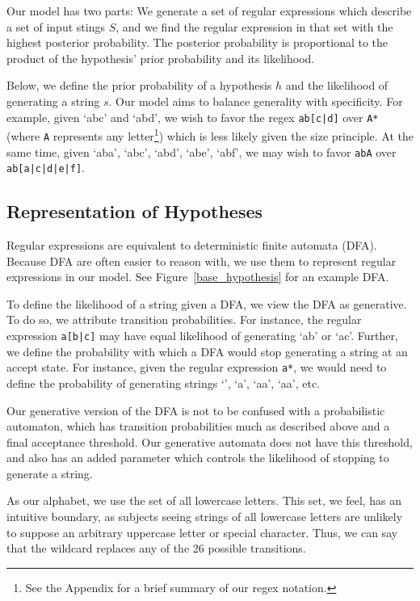 \documentclass[10pt,letterpaper]{article}
\begin{document}
Our model has two parts: We generate a set of regular expressions which describe a set of input stings $S$, and we find the regular expression in that set with the highest posterior probability. The posterior probability is proportional to the product of the hypothesis' prior probability and its likelihood.

Below, we define the prior probability of a hypothesis $h$ and the likelihood of generating a string $s$. Our model aims to balance generality with specificity. For example, given `abc' and `abd', we wish to favor the regex \verb!ab[c|d]! over \verb!A*! (where \verb!A! represents any letter\footnote{See the Appendix for a brief summary of our regex notation.}) which is less likely given the size principle. At the same time, given `aba', `abc', `abd', `abe', `abf', we may wish to favor \verb!abA! over \verb!ab[a|c|d|e|f]!.

\subsection{Representation of Hypotheses}

Regular expressions are equivalent to deterministic finite automata (DFA). Because DFA are often easier to reason with, we use them to represent regular expressions in our model. See Figure~\ref{base_hypothesis} for an example DFA.

To define the likelihood of a string given a DFA, we view the DFA as generative. To do so, we attribute transition probabilities. For instance, the regular expression \verb!a[b|c]! may have equal likelihood of generating `ab' or `ac'. Further, we define the probability with which a DFA would stop generating a string at an accept state. For instance, given the regular expression \verb!a*!, we would need to define the probability of generating strings `', `a', `aa', `aa', etc.

Our generative version of the DFA is not to be confused with a probabilistic automaton, which has transition probabilities much as described above and a final acceptance threshold. Our generative automata does not have this threshold, and also has an added parameter which controls the likelihood of stopping to generate a string.

As our alphabet, we use the set of all lowercase letters. This set, we feel, has an intuitive boundary, as subjects seeing strings of all lowercase letters are unlikely to suppose an arbitrary uppercase letter or special character. Thus, we can say that the wildcard replaces any of the 26 possible transitions.
\end{document}
